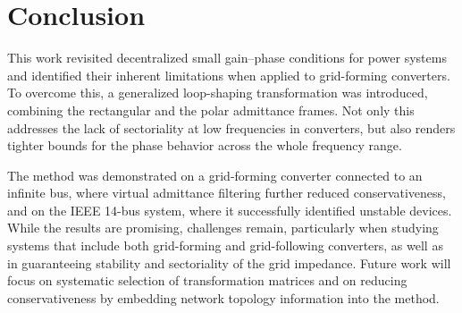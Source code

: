 \section{Conclusion}


This work revisited decentralized small gain–phase conditions for power systems and identified their inherent limitations when applied to grid-forming converters. To overcome this, a generalized loop-shaping transformation was introduced, combining the rectangular and the polar admittance frames. Not only this addresses the lack of sectoriality at low frequencies in converters, but also renders tighter bounds for the phase behavior across the whole frequency range.

The method was demonstrated on a grid-forming converter connected to an infinite bus, where virtual admittance filtering further reduced conservativeness, and on the IEEE 14-bus system, where it successfully identified unstable devices. While the results are promising, challenges remain, particularly when studying systems that include both grid-forming and grid-following converters, as well as in guaranteeing stability and sectoriality of the grid impedance. Future work will focus on systematic selection of transformation matrices and on reducing conservativeness by embedding network topology information into the method.



